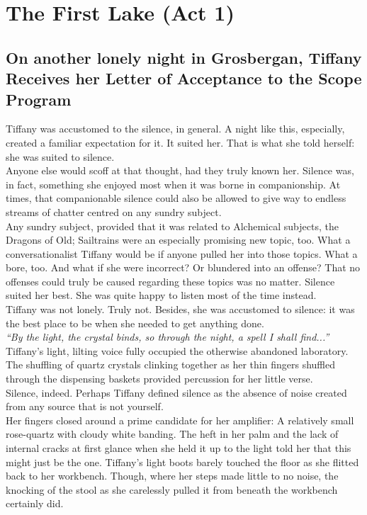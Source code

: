 \chapter{The First Lake (Act 1)}

\section{On another lonely night in Grosbergan, Tiffany Receives her Letter of Acceptance to the Scope Program}

Tiffany was accustomed to the silence, in general.
A night like this, especially, created a familiar expectation for it.
It suited her.
That is what she told herself: she was suited to silence.\\

Anyone else would scoff at that thought, had they truly known her.
Silence was, in fact, something she enjoyed most when it was borne in companionship. 
At times, that companionable silence could also be allowed to give way to endless streams of chatter centred on any sundry subject.\\

Any sundry subject, provided that it was related to Alchemical subjects, the Dragons of Old; Sailtrains were an especially promising new topic, too.
What a conversationalist Tiffany would be if anyone pulled her into those topics.
What a bore, too.
And what if she were incorrect? Or blundered into an offense?
That no offenses could truly be caused regarding these topics was no matter.
Silence suited her best.
She was quite happy to listen most of the time instead.\\

Tiffany was not lonely.
Truly not.
Besides, she was accustomed to silence: it was the best place to be when she needed to get anything done.\\

\textit{``By the light, the crystal binds, so through the night, a spell I shall find...''}
Tiffany's light, lilting voice fully occupied the otherwise abandoned laboratory. 
The shuffling of quartz crystals clinking together as her thin fingers shuffled through the dispensing baskets provided percussion for her little verse.\\

Silence, indeed. 
Perhaps Tiffany defined silence as the absence of noise created from any source that is not yourself.\\

Her fingers closed around a prime candidate for her amplifier: A relatively small rose-quartz with cloudy white banding.
The heft in her palm and the lack of internal cracks at first glance when she held it up to the light told her that this might just be the one.
Tiffany's light boots barely touched the floor as she flitted back to her workbench.
Though, where her steps made little to no noise, the knocking of the stool as she carelessly pulled it from beneath the workbench certainly did.\\

